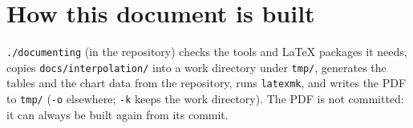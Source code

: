 \documentclass[11pt,a4paper]{article}
\begin{document}
\appendix
\section{How this document is built}
\texttt{./documenting} (in the repository) checks the tools and LaTeX packages it needs, copies
\texttt{docs/interpolation/} into a work directory under \texttt{tmp/}, generates the tables and the
chart data from the repository, runs \texttt{latexmk}, and writes the PDF to \texttt{tmp/} (\texttt{-o}
elsewhere; \texttt{-k} keeps the work directory). The PDF is not committed: it can always be built
again from its commit.
\end{document}
